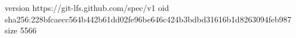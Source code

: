 version https://git-lfs.github.com/spec/v1
oid sha256:228bfcaecc564b442b61dd02fe96be646c424b3bdbd31616b1d8263094feb987
size 5566
